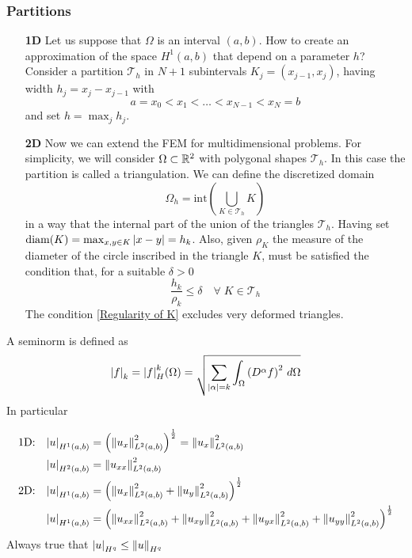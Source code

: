 \subsubsection*{Partitions}
\begin{itemize}
    \item[\textbf{1D}]
    Let us suppose that \(\Omega\) is an interval \((a,b)\). How to create an approximation of the space \(H^1(a,b)\) that depend on a parameter \(h\)? Consider a partition \(\mathcal{T}_h\) in \(N+1\) subintervals \(K_j = (x_{j-1}, x_j)\), having width \(h_j = x_j - x_{j-1}\) with 
    \begin{equation}
        a = x_0 < x_1 < \ldots < x_{N-1} < x_N = b \label{Partition of an interval}
    \end{equation}
    and set \(h = \max_j h_j\). 
    \item[\textbf{2D}] Now we can extend the FEM for multidimensional problems. For simplicity, we will consider \(\Omega \subset \mathbb{R}^2\) with polygonal shapes \(\mathcal{T}_h\). In this case the partition is called a triangulation. We can define the discretized domain 
    \[
        \Omega_h = \text{int}\left(\bigcup_{K \in \mathcal{T}_h} K\right)
    \]
    in a way that the internal part of the union of the triangles \(\mathcal{T}_h\). Having set \(\text{diam}(K) = \max_{x,y \in K} \abs{x-y} = h_k\). Also, given \(\rho_K\) the measure of the diameter of the circle inscribed in the triangle \(K\), must be satisfied the condition that, for a suitable \(\delta > 0\) 
    \begin{equation}
        \frac{h_k}{\rho_k} \leq \delta \quad \forall \; K \in \mathcal{T}_h \label{Regularity of K}
    \end{equation}
    The condition \eqref{Regularity of K} excludes very deformed triangles.

\end{itemize}

\begin{definition}[Seminorms]
    A seminorm is defined as 
    \[
        \abs{f}_k = \abs{f}_H^k (\Omega) = \sqrt{\sum_{\abs{\alpha} = k} \int_\Omega \left(D^\alpha f\right)^2 \, d\Omega}
    \]
    In particular 

        \begin{align*}
            \text{1D:}\quad  \abs{u}_{H^1(a,b)} & = \left(\norm{u_x}^2_{L^2(a,b)}\right)^{\frac{1}{2}} = \norm{u_x}^2_{L^2(a,b)} \\
              \abs{u}_{H^2(a,b)} & = \norm{u_{xx}}^2_{L^2(a,b)} \\
            \text{2D:}\quad  \abs{u}_{H^1(a,b)} & = \left(\norm{u_x}^2_{L^2(a,b)} + \norm{u_y}^2_{L^2(a,b)}\right)^{\frac{1}{2}} \\
             \abs{u}_{H^1(a,b)} & = \left(\norm{u_{xx}}^2_{L^2(a,b)} + \norm{u_{xy}}^2_{L^2(a,b)} + \norm{u_{yx}}^2_{L^2(a,b)} +\norm{u_{yy}}^2_{L^2(a,b)}\right)^{\frac{1}{2}} \\
        \end{align*}
    Always true that \(\abs{u}_{H^q} \leq \norm{u}_{H^q}\)
\end{definition}

